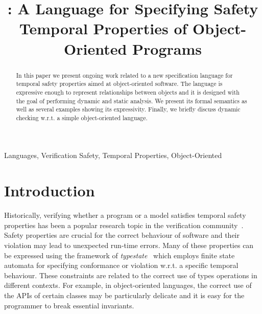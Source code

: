\documentclass[preprint]{sigplanconf} %
\title{\TPL: A Language for Specifying Safety Temporal Properties of Object-Oriented Programs}
\theoremstyle{definition}
\theoremstyle{remark}
\begin{document}
\maketitle

\begin{abstract} %
In this paper we present ongoing work related to a new specification language for temporal safety properties aimed at object-oriented software.
The language is expressive enough to represent relationships between objects and it is designed with the goal of performing dynamic and static analysis. 
We present its formal semantics as well as several examples showing its expressivity.
Finally,  we briefly discuss dynamic checking w.r.t. a simple object-oriented language.
\end{abstract}
\terms Languages, Verification
\keywords Safety, Temporal Properties, Object-Oriented

\section{Introduction} %
Historically, verifying whether a program or a model satisfies  temporal safety properties has been a popular research topic in the
verification community~\cite{DBLP:books/daglib/0080029,dblp:conf/cav/ballr01,dblp:conf/oopsla/bierhoffa07,DBLP:journals/tse/Holzmann97}. Safety properties are crucial for the correct behaviour of software and their  violation  may lead to unexpected run-time errors.
%
Many of these properties can be expressed using the framework of {\em typestate}~\cite{strom1986} which employs finite state automata for specifying conformance or violation w.r.t. a specific temporal behaviour.
These constraints are related to the correct use of types operations in different contexts.
For example, in object-oriented languages, the correct use of the APIs of certain classes may be particularly delicate and it is easy for the programmer to break essential invariants.
\end{document}
